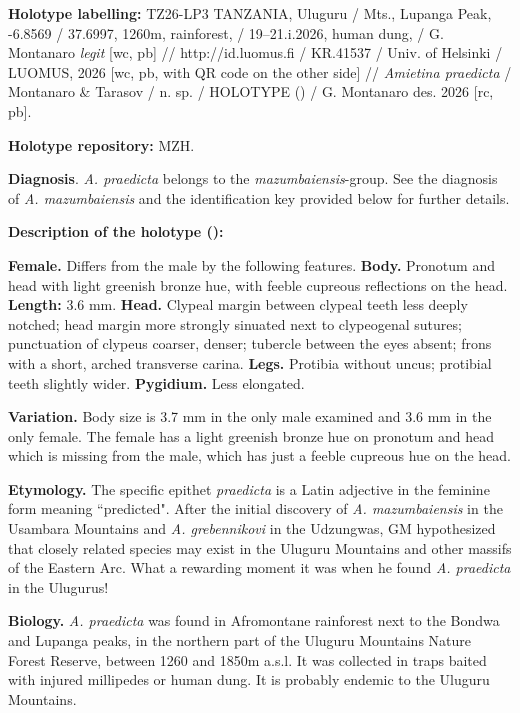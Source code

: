 \documentclass[fleqn,10pt,lineno]{wlpeerj}
\begin{document}
\textbf{Holotype labelling:} TZ26-LP3 TANZANIA, Uluguru / Mts., Lupanga Peak, -6.8569 / 37.6997, 1260m, rainforest, / 19–21.i.2026, human dung, / G. Montanaro \textit{legit} [wc, pb] // http://id.luomus.fi / KR.41537 / Univ. of Helsinki / LUOMUS, 2026 [wc, pb, with QR code on the other side] // \textit{Amietina praedicta} / Montanaro \& Tarasov / n. sp. / HOLOTYPE (\male) / G. Montanaro des. 2026 [rc, pb].

\textbf{Holotype repository:} MZH.

\textbf{Diagnosis}. \textit{A. praedicta} belongs to the \textit{mazumbaiensis}-group. See the diagnosis of \textit{A. mazumbaiensis} and the identification key provided below for further details.

\textbf{Description of the holotype (\male):}


\textbf{Female.} Differs from the male by the following features. \textbf{Body.} Pronotum and head with light greenish bronze hue, with feeble cupreous reflections on the head. \textbf{Length:} 3.6 mm. \textbf{Head.} Clypeal margin between clypeal teeth less deeply notched; head margin more strongly sinuated next to clypeogenal sutures; punctuation of clypeus coarser, denser; tubercle between the eyes absent; frons with a short, arched transverse carina. \textbf{Legs.} Protibia without uncus; protibial teeth slightly wider. \textbf{ Pygidium.} Less elongated.

\textbf{Variation.} Body size is 3.7 mm in the only male examined and 3.6 mm in the only female. The female has a light greenish bronze hue on pronotum and head which is missing from the male, which has just a feeble cupreous hue on the head.

\textbf{Etymology.} The specific epithet \textit{praedicta} is a Latin adjective in the feminine form meaning ``predicted". After the initial discovery of \textit{A. mazumbaiensis} in the Usambara Mountains and \textit{A. grebennikovi} in the Udzungwas, GM hypothesized that closely related species may exist in the Uluguru Mountains and other massifs of the Eastern Arc. What a rewarding moment it was when he found \textit{A. praedicta} in the Ulugurus!

\textbf{Biology.} \textit{A. praedicta} was found in Afromontane rainforest next to the Bondwa and Lupanga peaks, in the northern part of the Uluguru Mountains Nature Forest Reserve, between 1260 and 1850m a.s.l. It was collected in traps baited with injured millipedes or human dung. It is probably endemic to the Uluguru Mountains.
\end{document}
